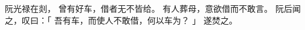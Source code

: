 
\switchcolumn*[\section{}]

阮光禄在剡，
曾有好车，借者无不皆给。
有人葬母，意欲借而不敢言。
阮后闻之，叹曰：「
    吾有车，而使人不敢借，何以车为？
」
遂焚之。

\switchcolumn


